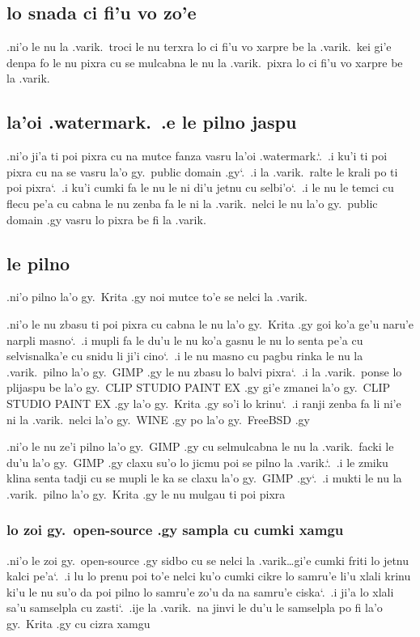 \documentclass{report}
\newcommand\sds{\spacefactor\sfcode`.\ \space}
\begin{document}
\subsection{lo snada ci fi'u vo zo'e}
.ni'o le nu la .varik.\ troci le nu terxra lo ci fi'u vo xarpre be la .varik.\ kei gi'e denpa fo le nu pixra cu se mulcabna le nu la .varik.\ pixra lo ci fi'u vo xarpre be la .varik.
\subsection{la'oi .watermark.\ .e le pilno jaspu}
.ni'o ji'a ti poi pixra cu na mutce fanza vasru la'oi .watermark.\sds  .i ku'i ti poi pixra cu na se vasru la'o gy.\ public domain .gy\sds  .i la .varik.\ ralte le krali po ti poi pixra\sds  .i ku'i cumki fa le nu le ni di'u jetnu cu selbi'o\sds  .i le nu le temci cu flecu pe'a cu cabna le nu zenba fa le ni la .varik.\ nelci le nu la'o gy.\ public domain .gy vasru lo pixra be fi la .varik.

\subsection{le pilno}
.ni'o pilno la'o gy.\ Krita .gy noi mutce to'e se nelci la .varik.

.ni'o le nu zbasu ti poi pixra cu cabna le nu la'o gy.\ Krita .gy goi ko'a ge'u naru'e narpli masno\sds  .i mupli fa le du'u le nu ko'a gasnu le nu lo senta pe'a cu selvisnalka'e cu snidu li ji'i cino\sds  .i le nu masno cu pagbu rinka le nu la .varik.\ pilno la'o gy.\ GIMP .gy le nu zbasu lo balvi pixra\sds  .i la .varik.\ ponse lo plijaspu be la'o gy.\ CLIP STUDIO PAINT EX .gy gi'e zmanei la'o gy.\ CLIP STUDIO PAINT EX .gy la'o gy.\ Krita .gy so'i lo krinu\sds  .i ranji zenba fa li ni'e ni la .varik.\ nelci la'o gy.\ WINE .gy po la'o gy.\ FreeBSD .gy

.ni'o le nu ze'i pilno la'o gy.\ GIMP .gy cu selmulcabna le nu la .varik.\ facki le du'u la'o gy.\ GIMP .gy claxu su'o lo jicmu poi se pilno la .varik.\sds  .i le zmiku klina senta tadji cu se mupli le ka se claxu la'o gy.\ GIMP .gy\sds  .i mukti le nu la .varik.\ pilno la'o gy.\ Krita .gy le nu mulgau ti poi pixra

\subsubsection{lo zoi gy.\ open-source .gy sampla cu cumki xamgu}
.ni'o le zoi gy.\ open-source .gy sidbo cu se nelci la .varik\ldots gi'e cumki friti lo jetnu kalci pe'a\sds  .i lu lo prenu poi to'e nelci ku'o cumki cikre lo samru'e li'u xlali krinu ki'u le nu su'o da poi pilno lo samru'e zo'u da na samru'e ciska\sds  .i ji'a lo xlali sa'u samselpla cu zasti\sds  .ije la .varik.\ na jinvi le du'u le samselpla po fi la'o gy.\ Krita .gy cu cizra xamgu
\end{document}
